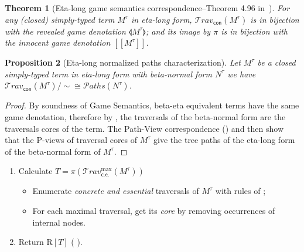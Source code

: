 \documentclass[xchauthor,chkrefs,GCNS,amsmath,amsthm,rotating,leaveRGB]{tcsg}
\theoremstyle{plain}
\newtheorem{theorem}{Theorem}[section]
\newtheorem{proposition}[theorem]{Proposition}
\theoremstyle{definition}
\newcommand\travset{\mathcal{T}\!rav}
\newcommand{\concrete}{\mathsf{con}}
\newcommand{\concreteessential}{\mathsf{c.e.}}
\newcommand{\travsetcon}{{\travset_{\concrete}}}
\newcommand{\travsetcones}{\travset_{\concreteessential}}
\def\structisomorphic{\cong}
\def\readout{\mathrm{R}}
\def\coresymbol{\pi}
\newcommand{\core}[1]{\coresymbol(#1)}
\newcommand{\Lbrack}{[\![}
\newcommand{\Rbrack}{]\!]}
\newcommand{\pathset}{{\mathcal{P}aths}}
\begin{document}
\begin{theorem}[Eta-long game semantics correspondence--Theorem 4.96 in~\cite{BlumPhd}]\label{thm:gamesem_correspondence_stlc}
For any (closed) simply-typed term $M^\tau $ in \emph{eta-long form},
$\travsetcon (M^\tau )$ is in bijection with the \emph{revealed game
denotation} ${\llangle  M^\tau   \rrangle }$; and its image
by $\coresymbol $ is in bijection with the innocent game denotation ${\Lbrack
M^\tau   \Rbrack}$.
\end{theorem}

\begin{proposition}[Eta-long normalized paths characterization]\label{prop:path_charact_stlc}
Let $M^\tau $ be a closed simply-typed term in eta-long form with beta-normal
form $N^\tau $ we have $\travsetcon (M^\tau )/{\sim } \structisomorphic
\pathset (N^\tau )$.
\end{proposition}

\begin{proof}
By soundness of Game Semantics, beta-eta equivalent terms have the same game
denotation, therefore by
, the traversals of
the beta-normal form are the traversals cores of the term. The Path-View
correspondence
() and
 then show that
the P-views of traversal cores of $M^\tau $ give the tree paths of the
eta-long form of the beta-normal form of $M^\tau $.
\end{proof}

\begin{algorithm}[t]
\caption{Normalization by traversals for typed terms in eta-long form.}\label{algo:stlc_normalization_by_traversals}
\begin{algorithmic}
%
\begin{enumerate}
  \item Calculate $T = \core{\travsetcones ^{\max }(M^\tau )}$
%
\begin{itemize}
    \item Enumerate \emph{concrete and essential} traversals of $M^\tau $
        with rules of
        ;
    \item For each maximal traversal, get its \emph{core} by removing
        occurrences of internal nodes.
  \end{itemize}
  \item Return $\readout [T]$ (
      ).
\end{enumerate}
\end{algorithmic}
\end{algorithm}
\end{document}
